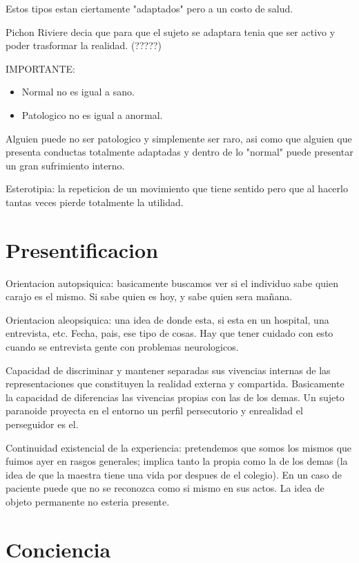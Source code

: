 \documentclass[12pt,a4paper]{article}
\begin{document}
Estos tipos estan ciertamente "adaptados" pero a un costo de salud. 

Pichon Riviere decia que para que el sujeto se adaptara tenia que ser
activo y poder trasformar la realidad. (?????) 

IMPORTANTE:

\begin{itemize}
	\item Normal no es igual a sano.
	\item Patologico no es igual a anormal. 
\end{itemize}

Alguien puede no ser patologico y simplemente ser raro, asi como que
alguien que presenta conductas totalmente adaptadas y dentro de lo
"normal" puede presentar un gran sufrimiento interno. 

Esterotipia: la repeticion de un movimiento que tiene sentido pero que
al hacerlo tantas veces pierde totalmente la utilidad.

\section{Presentificacion}%
\label{sec:presentificacion}

Orientacion autopsiquica: basicamente buscamos ver si el individuo
sabe quien carajo es el mismo. Si sabe quien es hoy, y sabe quien sera
mañana. 

Orientacion aleopsiquica: una idea de donde esta, si esta en un
hospital, una entrevista, etc. Fecha, pais, ese tipo de cosas. Hay que
tener cuidado con esto cuando se entrevista gente con problemas
neurologicos. 

Capacidad de discriminar y mantener separadas sus vivencias internas de
las representaciones que constituyen la realidad externa y compartida.
Basicamente la capacidad de diferencias las vivencias propias con las de
los demas. Un sujeto paranoide proyecta en el entorno un perfil
persecutorio y enrealidad el perseguidor es el. 

Continuidad existencial de la experiencia: pretendemos que somos los
mismos que fuimos ayer en rasgos generales; implica tanto la propia como
la de los demas (la idea de que la maestra tiene una vida por despues de
el colegio). En un caso de paciente puede que no se reconozca como si
mismo en sus actos. La idea de objeto permanente no esteria presente.

\section{Conciencia}%
\label{sec:conciencia}
\end{document}
